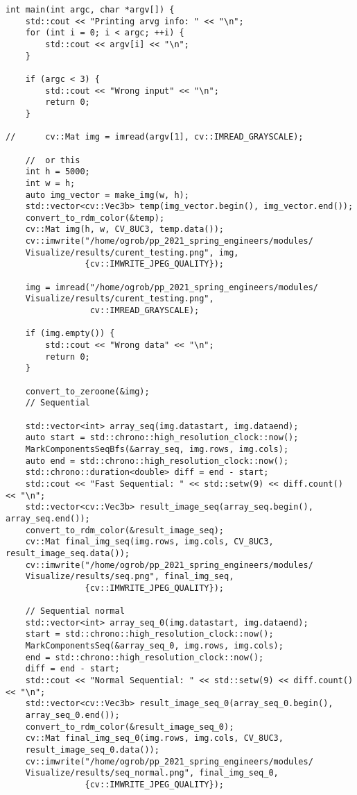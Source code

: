 \documentclass{report}
\begin{document}
\begin{lstlisting}
int main(int argc, char *argv[]) {
    std::cout << "Printing arvg info: " << "\n";
    for (int i = 0; i < argc; ++i) {
        std::cout << argv[i] << "\n";
    }

    if (argc < 3) {
        std::cout << "Wrong input" << "\n";
        return 0;
    }

//      cv::Mat img = imread(argv[1], cv::IMREAD_GRAYSCALE);

    //  or this
    int h = 5000;
    int w = h;
    auto img_vector = make_img(w, h);
    std::vector<cv::Vec3b> temp(img_vector.begin(), img_vector.end());
    convert_to_rdm_color(&temp);
    cv::Mat img(h, w, CV_8UC3, temp.data());
    cv::imwrite("/home/ogrob/pp_2021_spring_engineers/modules/
    Visualize/results/curent_testing.png", img,
                {cv::IMWRITE_JPEG_QUALITY});

    img = imread("/home/ogrob/pp_2021_spring_engineers/modules/
    Visualize/results/curent_testing.png",
                 cv::IMREAD_GRAYSCALE);

    if (img.empty()) {
        std::cout << "Wrong data" << "\n";
        return 0;
    }

    convert_to_zeroone(&img);
    // Sequential

    std::vector<int> array_seq(img.datastart, img.dataend);
    auto start = std::chrono::high_resolution_clock::now();
    MarkComponentsSeqBfs(&array_seq, img.rows, img.cols);
    auto end = std::chrono::high_resolution_clock::now();
    std::chrono::duration<double> diff = end - start;
    std::cout << "Fast Sequential: " << std::setw(9) << diff.count() << "\n";
    std::vector<cv::Vec3b> result_image_seq(array_seq.begin(), array_seq.end());
    convert_to_rdm_color(&result_image_seq);
    cv::Mat final_img_seq(img.rows, img.cols, CV_8UC3, result_image_seq.data());
    cv::imwrite("/home/ogrob/pp_2021_spring_engineers/modules/
    Visualize/results/seq.png", final_img_seq,
                {cv::IMWRITE_JPEG_QUALITY});

    // Sequential normal
    std::vector<int> array_seq_0(img.datastart, img.dataend);
    start = std::chrono::high_resolution_clock::now();
    MarkComponentsSeq(&array_seq_0, img.rows, img.cols);
    end = std::chrono::high_resolution_clock::now();
    diff = end - start;
    std::cout << "Normal Sequential: " << std::setw(9) << diff.count() << "\n";
    std::vector<cv::Vec3b> result_image_seq_0(array_seq_0.begin(),
    array_seq_0.end());
    convert_to_rdm_color(&result_image_seq_0);
    cv::Mat final_img_seq_0(img.rows, img.cols, CV_8UC3,
    result_image_seq_0.data());
    cv::imwrite("/home/ogrob/pp_2021_spring_engineers/modules/
    Visualize/results/seq_normal.png", final_img_seq_0,
                {cv::IMWRITE_JPEG_QUALITY});


\end{lstlisting}
\end{document}
